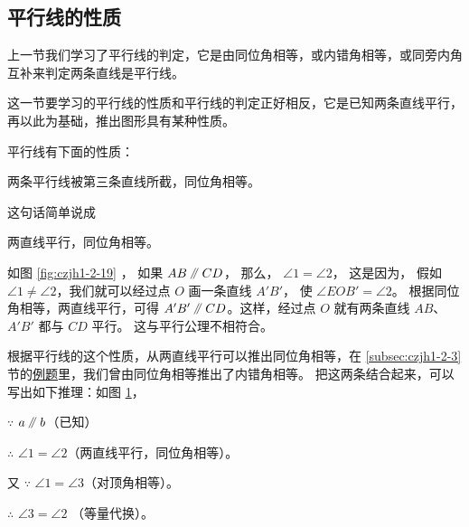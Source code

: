 \subsection{平行线的性质}\label{subsec:czjh1-2-7}

上一节我们学习了平行线的判定，它是由同位角相等，或内错角相等，或同旁内角互补来判定两条直线是平行线。

这一节要学习的平行线的性质和平行线的判定正好相反，它是已知两条直线平行，再以此为基础，推出图形具有某种性质。

平行线有下面的性质：

\begin{xingzhi}
    两条平行线被第三条直线所截，同位角相等。
\end{xingzhi}

这句话简单说成\begin{xingzhi}%
    两直线平行，同位角相等。
\end{xingzhi}

如图 \ref{fig:czjh1-2-19} ， 如果 $AB \pingxing CD$， 那么， $\angle 1 = \angle 2$， 这是因为，
假如 $\angle 1 \neq \angle 2$，我们就可以经过点 $O$ 画一条直线 $A'B'$， 使 $\angle EOB' = \angle 2$。
根据同位角相等，两直线平行，可得 $A'B' \pingxing CD$。这样，经过点 $O$ 就有两条直线 $AB$、$A'B'$ 都与 $CD$ 平行。
这与平行公理不相符合。

\begin{figure}[htbp]
    \centering
    \begin{minipage}[b]{7cm}
        \centering
        
        \caption{}\label{fig:czjh1-2-19}
    \end{minipage}
    \qquad
    \begin{minipage}[b]{7cm}
        \centering
        
        \caption{}\label{fig:czjh1-2-20}
    \end{minipage}
\end{figure}



根据平行线的这个性质，从两直线平行可以推出同位角相等，在 \ref{subsec:czjh1-2-3} 节的\hyperref[liti:czjh1-2-3]{例题}里，我们曾由同位角相等推出了内错角相等。
把这两条结合起来，可以写出如下推理：如图 \ref{fig:czjh1-2-20}，

$\because$ \quad $a \pingxing b$（已知）

$\therefore$ \quad $\angle 1 = \angle 2$（两直线平行，同位角相等）。

又 $\because$ \quad $\angle 1 = \angle 3$（对顶角相等）。

$\therefore$ \quad $\angle 3 = \angle 2$ （等量代换）。

